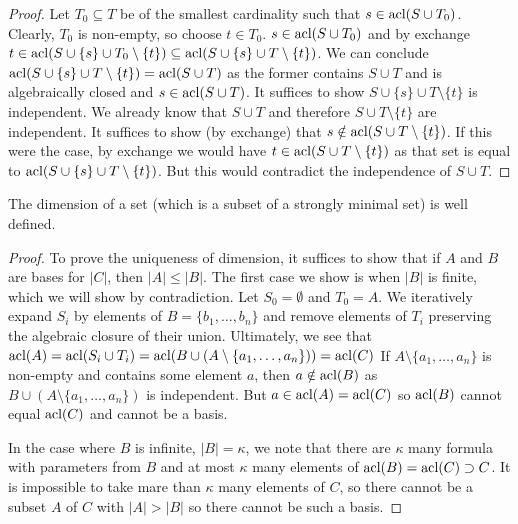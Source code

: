 \begin{proof}
Let \(T_0 \subseteq T\) be of the smallest cardinality such that \(s \in \text{acl}(S \cup T_0)\). 
Clearly, \(T_0\) is non-empty, so choose \(t \in T_0\). 
\(s \in \text{acl}(S \cup T_0)\) and by exchange \(t \in \text{acl}(S \cup \{s\} \cup T_0 \setminus \{t\}) \subseteq \text{acl}(S \cup \{s\} \cup T \setminus \{t\})\).
We can conclude \(\text{acl}(S \cup \{s\} \cup T \setminus \{t\}) = \text{acl}(S \cup T)\) as the former contains \(S \cup T\) and is algebraically closed and \(s \in \text{acl}(S \cup T)\). 
It suffices to show \(S \cup \{s\} \cup T \setminus \{t\}\) is independent. 
We already know that \(S \cup T\) and therefore \(S \cup T \setminus \{t\}\) are independent. 
It suffices to show (by exchange) that \(s \notin \text{acl}(S \cup T \setminus \{t\})\).
If this were the case, by exchange we would have \(t \in \text{acl}(S \cup T \setminus \{t\})\) as that set is equal to \(\text{acl}(S \cup \{s\} \cup T \setminus\{t\})\).
But this would contradict the independence of \(S \cup T\). 
\end{proof}

\begin{theorem}\label{theorem_dimension}
The dimension of a set (which is a subset of a strongly minimal set) is well defined.
\end{theorem}

\begin{proof}
To prove the uniqueness of dimension, it suffices to show that if \(A\) and \(B\) are bases for \(|C|\), then \(|A| \leq |B|\). 
The first case we show is when \(|B|\) is finite, which we will show by contradiction.  
Let \(S_0 = \emptyset\) and \(T_0 = A\). We iteratively expand \(S_i\) by elements of \(B = \{b_1, \ldots, b_n\}\) and remove elements of \(T_i\) preserving the algebraic closure of their union. 
Ultimately, we see that \(\text{acl}(A) = \text{acl}(S_i \cup T_i) = \text{acl}(B \cup (A \setminus \{a_1, \ldots, a_n\})) = \text{acl}(C)\)
If \(A \setminus \{a_1, \ldots, a_n\}\) is non-empty and contains some element \(a\), then \(a \notin \text{acl}(B)\) as \(B \cup (A \setminus \{a_1, \ldots, a_n\})\) is independent. 
But \(a \in \text{acl}(A) = \text{acl}(C)\) so \(\text{acl}(B)\) cannot equal \(\text{acl}(C)\) and cannot be a basis. 

In the case where \(B\) is infinite, \(|B| = \kappa\), we note that there are \(\kappa\) many formula with parameters from \(B\) and at most \(\kappa\) many elements of \(\text{acl}(B) = \text{acl}(C) \supset C\). 
It is impossible to take mare than \(\kappa\) many elements of \(C\), so there cannot be a subset \(A\) of \(C\) with \(|A| > |B|\) so there cannot be such a basis. 
\end{proof}

